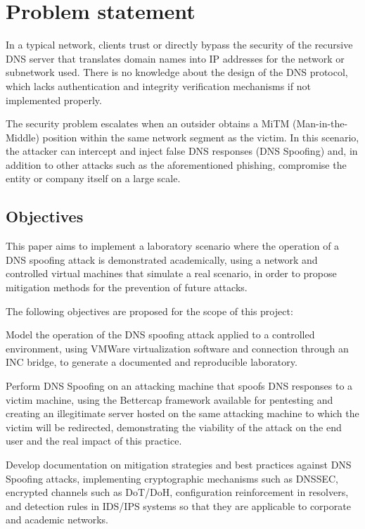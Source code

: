 \documentclass[conference]{IEEEtran}
\begin{document}
\section{Problem statement}
In a typical network, clients trust or directly bypass the security of the recursive DNS server that translates domain names into IP addresses for the network or subnetwork used. There is no knowledge about the design of the DNS protocol, which lacks authentication and integrity verification mechanisms if not implemented properly.

The security problem escalates when an outsider obtains a MiTM (Man-in-the-Middle) position within the same network segment as the victim. In this scenario, the attacker can intercept and inject false DNS responses (DNS Spoofing) and, in addition to other attacks such as the aforementioned phishing, compromise the entity or company itself on a large scale.

\subsection{Objectives}
This paper aims to implement a laboratory scenario where the operation of a DNS spoofing attack is demonstrated academically, using a network and controlled virtual machines that simulate a real scenario, in order to propose mitigation methods for the prevention of future attacks.

The following objectives are proposed for the scope of this project:

Model the operation of the DNS spoofing attack applied to a controlled environment, using VMWare virtualization software and connection through an INC bridge, to generate a documented and reproducible laboratory.

Perform DNS Spoofing on an attacking machine that spoofs DNS responses to a victim machine, using the Bettercap framework available for pentesting and creating an illegitimate server hosted on the same attacking machine to which the victim will be redirected, demonstrating the viability of the attack on the end user and the real impact of this practice.

Develop documentation on mitigation strategies and best practices against DNS Spoofing attacks, implementing cryptographic mechanisms such as DNSSEC, encrypted channels such as DoT/DoH, configuration reinforcement in resolvers, and detection rules in IDS/IPS systems so that they are applicable to corporate and academic networks.
\end{document}
